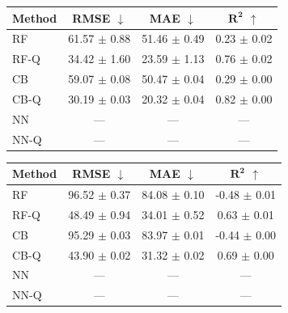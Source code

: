 \begin{table}[t]
    \vspace{1em}

    \begin{minipage}{0.48\textwidth}
        \centering
        \label{tab:ood-a100}
        \begin{tabular}{lccc}
            \toprule
            \textbf{Method} & \textbf{RMSE} $\downarrow$ & \textbf{MAE} $\downarrow$ & $\boldsymbol{R^2}$ $\uparrow$ \\
            \midrule
            RF      & 61.57 $\pm$ 0.88 & 51.46 $\pm$ 0.49 & 0.23 $\pm$ 0.02 \\
            RF-Q    & 34.42 $\pm$ 1.60 & 23.59 $\pm$ 1.13 & 0.76 $\pm$ 0.02 \\
            \midrule
            CB      & 59.07 $\pm$ 0.08 & 50.47 $\pm$ 0.04 & 0.29 $\pm$ 0.00 \\
            CB-Q    & 30.19 $\pm$ 0.03 & 20.32 $\pm$ 0.04 & 0.82 $\pm$ 0.00 \\
            \midrule
            NN      & --- & --- & --- \\
            NN-Q    & --- & --- & --- \\
            \bottomrule
        \end{tabular}
    \end{minipage}
    \hfill
    \begin{minipage}{0.48\textwidth}
        \centering
        \label{tab:ood-h100}
        \begin{tabular}{lccc}
            \toprule
            \textbf{Method} & \textbf{RMSE} $\downarrow$ & \textbf{MAE} $\downarrow$ & $\boldsymbol{R^2}$ $\uparrow$ \\
            \midrule
            RF      & 96.52 $\pm$ 0.37 & 84.08 $\pm$ 0.10 & -0.48 $\pm$ 0.01 \\
            RF-Q    & 48.49 $\pm$ 0.94 & 34.01 $\pm$ 0.52 & 0.63 $\pm$ 0.01 \\
            \midrule
            CB      & 95.29 $\pm$ 0.03 & 83.97 $\pm$ 0.01 & -0.44 $\pm$ 0.00 \\
            CB-Q    & 43.90 $\pm$ 0.02 & 31.32 $\pm$ 0.02 & 0.69 $\pm$ 0.00 \\
            \midrule
            NN      & --- & --- & --- \\
            NN-Q    & --- & --- & --- \\
            \bottomrule
        \end{tabular}
    \end{minipage}
\end{table}